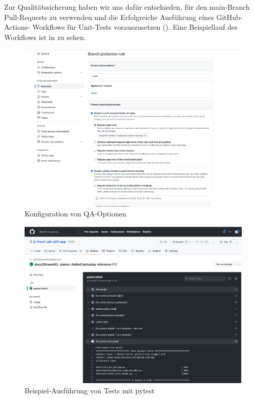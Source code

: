 Zur Qualitätssicherung haben wir uns dafür entschieden, für den main-Branch
Pull-Requests zu verwenden und die Erfolgreiche Ausführung eines GitHub-Actions-
Workflows für Unit-Tests vorauszusetzen (). Eine Beispiellauf des
Workflows ist in  zu sehen.

\begin{figure}[!h]
 	\includegraphics[scale=0.25]{../images/ci_protection.png}
 	\caption{Konfiguration von QA-Optionen}
	\label{fig:git_qa}
\end{figure}


\begin{figure}[!h]
 	\includegraphics[scale=0.25]{../images/ci_actions.png}
 	\caption{Beispiel-Ausführung von Tests mit pytest}
	\label{fig:pytest}
\end{figure}

